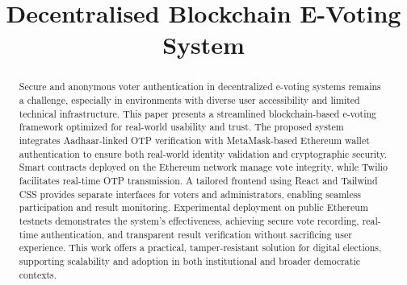 \documentclass[conference]{IEEEtran}
\begin{document}
\title{Decentralised Blockchain E-Voting System\\


}
\author{
\and
{}
\and
{}

}

\maketitle

\begin{abstract}
Secure and anonymous voter authentication in decentralized e-voting systems remains a challenge, especially in environments with diverse user accessibility and limited technical infrastructure. This paper presents a streamlined blockchain-based e-voting framework optimized for real-world usability and trust. The proposed system integrates Aadhaar-linked OTP verification with MetaMask-based Ethereum wallet authentication to ensure both real-world identity validation and cryptographic security. Smart contracts deployed on the Ethereum network manage vote integrity, while Twilio facilitates real-time OTP transmission. A tailored frontend using React and Tailwind CSS provides separate interfaces for voters and administrators, enabling seamless participation and result monitoring. Experimental deployment on public Ethereum testnets demonstrates the system’s effectiveness, achieving secure vote recording, real-time authentication, and transparent result verification without sacrificing user experience. This work offers a practical, tamper-resistant solution for digital elections, supporting scalability and adoption in both institutional and broader democratic contexts.
\end{abstract}
\end{document}
